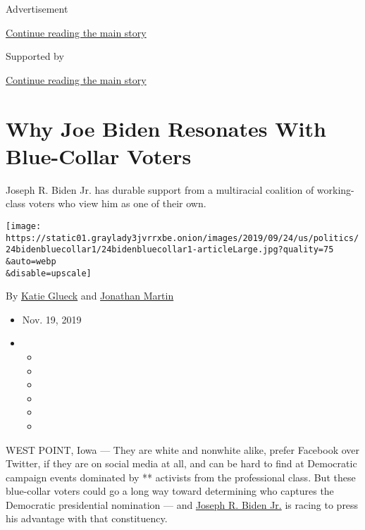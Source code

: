 Advertisement

\protect\hyperlink{after-top}{Continue reading the main story}

Supported by

\protect\hyperlink{after-sponsor}{Continue reading the main story}

\hypertarget{why-joe-biden-resonates-with-blue-collar-voters}{%
\section{Why Joe Biden Resonates With Blue-Collar
Voters}\label{why-joe-biden-resonates-with-blue-collar-voters}}

Joseph R. Biden Jr. has durable support from a multiracial coalition of
working-class voters who view him as one of their own.

\texttt{[image: https://static01.graylady3jvrrxbe.onion/images/2019/09/24/us/politics/24bidenbluecollar1/24bidenbluecollar1-articleLarge.jpg?quality=75\\\&auto=webp\\\&disable=upscale]}

By \href{https://www.nytimes3xbfgragh.onion/by/katie-glueck}{Katie
Glueck} and
\href{https://www.nytimes3xbfgragh.onion/by/jonathan-martin}{Jonathan
Martin}

\begin{itemize}
\item
  Nov. 19, 2019
\item
  \begin{itemize}
  \item
  \item
  \item
  \item
  \item
  \item
  \end{itemize}
\end{itemize}

WEST POINT, Iowa --- They are white and nonwhite alike, prefer Facebook
over Twitter, if they are on social media at all, and can be hard to
find at Democratic campaign events dominated by ** activists from the
professional class. But these blue-collar voters could go a long way
toward determining who captures the Democratic presidential nomination
--- and
\href{https://www.nytimes3xbfgragh.onion/interactive/2020/us/elections/joe-biden.html}{Joseph
R. Biden Jr.} is racing to press his advantage with that constituency.

